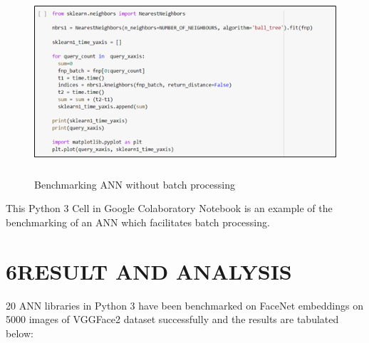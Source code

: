 \documentclass[12pt]{article}
\renewcommand{\_}{\kern-1.5pt\textunderscore\kern-1.5pt}
\begin{document}
\begin{Center}



\begin{figure}[H]
	\begin{Center}
		\includegraphics[width=5.43in,height=2.72in]{./media/image7.png}
		\caption{Benchmarking ANN without batch processing}
		\label{fig:Benchmarking_ANN_without_batch_processing}
	\end{Center}
\end{figure}




\end{Center}\par

\begin{justify}
This Python 3 Cell in Google Colaboratory Notebook is an example of the benchmarking of an ANN which facilitates batch processing.
\end{justify}\par

\section*{6\hspace*{10pt}RESULT AND ANALYSIS}
\begin{justify}
20 ANN libraries in Python 3 have been benchmarked on FaceNet embeddings \cite{schroff2015facenet}  on 5000 images of VGGFace2 dataset \cite{cao2018vggface2} successfully and the results are tabulated below:
\end{justify}\par
\end{document}
